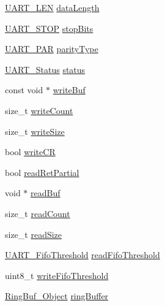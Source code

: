 \begin{DoxyCompactItemize}
\hyperlink{_u_a_r_t_8h_adf245d5f10db0abcbd8ad62a0d80c694}{U\+A\+R\+T\+\_\+\+L\+E\+N} \hyperlink{struct_u_a_r_t_c_c26_x_x___object_a2f9a4fa7ee40a43897a2df10d936ab0f}{data\+Length}
\item 
\hyperlink{_u_a_r_t_8h_a176b71ca19bc13d7534fa30fc18c2243}{U\+A\+R\+T\+\_\+\+S\+T\+O\+P} \hyperlink{struct_u_a_r_t_c_c26_x_x___object_ae5a931f5b2f5de1c3aa6852856ca1b4a}{stop\+Bits}
\item 
\hyperlink{_u_a_r_t_8h_ac70b5aa75500b8c45a51ec560deccfc4}{U\+A\+R\+T\+\_\+\+P\+A\+R} \hyperlink{struct_u_a_r_t_c_c26_x_x___object_ab42ca16e6fc784e7d0a727b1e9c6b299}{parity\+Type}
\item 
\hyperlink{_u_a_r_t_c_c26_x_x_8h_a778bbef5f4b52a5651552136715f53c4}{U\+A\+R\+T\+\_\+\+Status} \hyperlink{struct_u_a_r_t_c_c26_x_x___object_a10ff4c367c40263e72d3494f78b9ce07}{status}
\item 
const void $\ast$ \hyperlink{struct_u_a_r_t_c_c26_x_x___object_a440f4f4b165c4c725e544f13ad9ed02b}{write\+Buf}
\item 
size\+\_\+t \hyperlink{struct_u_a_r_t_c_c26_x_x___object_ac1e9fe4a759db1bb57ea9e50af9b08c2}{write\+Count}
\item 
size\+\_\+t \hyperlink{struct_u_a_r_t_c_c26_x_x___object_a6532e1f4a50fcf7e6908f7502a64fea6}{write\+Size}
\item 
bool \hyperlink{struct_u_a_r_t_c_c26_x_x___object_adc03957f1fbafe66c14fd7d9308a5e71}{write\+C\+R}
\item 
bool \hyperlink{struct_u_a_r_t_c_c26_x_x___object_af8d33692f51db0e0874b0568e7011e78}{read\+Ret\+Partial}
\item 
void $\ast$ \hyperlink{struct_u_a_r_t_c_c26_x_x___object_a9672e42f229731578af8a2c81f3f84db}{read\+Buf}
\item 
size\+\_\+t \hyperlink{struct_u_a_r_t_c_c26_x_x___object_a860c348843ce491dc8787304ddc84f38}{read\+Count}
\item 
size\+\_\+t \hyperlink{struct_u_a_r_t_c_c26_x_x___object_abefd4ca2a4db441a73e8b373a6947f85}{read\+Size}
\item 
\hyperlink{_u_a_r_t_c_c26_x_x_8h_a292a5e751577698b215f5e8aa1c79e99}{U\+A\+R\+T\+\_\+\+Fifo\+Threshold} \hyperlink{struct_u_a_r_t_c_c26_x_x___object_a8d3886d0973101575bac69dc7bf5d587}{read\+Fifo\+Threshold}
\item 
uint8\+\_\+t \hyperlink{struct_u_a_r_t_c_c26_x_x___object_aad6be8e2a10e4a97ef30de3bc00f74d6}{write\+Fifo\+Threshold}
\item 
\hyperlink{struct_ring_buf___object}{Ring\+Buf\+\_\+\+Object} \hyperlink{struct_u_a_r_t_c_c26_x_x___object_aca1cb90c83d3e045058469a997340c29}{ring\+Buffer}

\end{DoxyCompactItemize}
